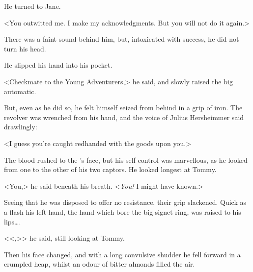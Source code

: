 He turned to Jane.

<You outwitted me. I make my acknowledgments. But you will not do it again.>

There was a faint sound behind him, but, intoxicated with success, he did not turn his head.

He slipped his hand into his pocket.

<Checkmate to the Young Adventurers,> he said, and slowly raised the big automatic.

But, even as he did so, he felt himself seized from behind in a grip of iron. The revolver was wrenched from his hand, and the voice of Julius Hersheimmer said drawlingly:

<I guess you're caught redhanded with the goods upon you.>

The blood rushed to the 's face, but his self-control was marvellous, as he looked from one to the other of his two captors. He looked longest at Tommy.

<You,> he said beneath his breath. <\emph{You!} I might have known.>

Seeing that he was disposed to offer no resistance, their grip slackened. Quick as a flash his left hand, the hand which bore the big signet ring, was raised to his lips\dots.

<<,>> he said, still looking at Tommy.

Then his face changed, and with a long convulsive shudder he fell forward in a crumpled heap, whilst an odour of bitter almonds filled the air. 